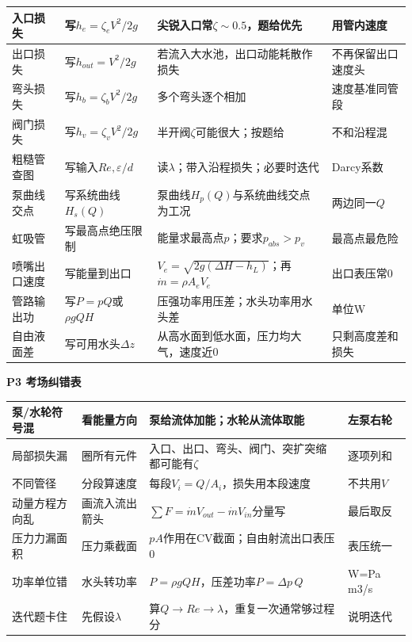 \documentclass[UTF8,a4paper]{ctexart}
\newcommand{\ftitle}[1]{\vspace{1pt}\textbf{\textcolor{B}{#1}}\par\vspace{0.5pt}}
\begin{document}
\begin{tabular}{|L{0.19\textwidth}|L{0.23\textwidth}|L{0.34\textwidth}|L{0.19\textwidth}|}\hline
入口损失 & 写$h_e=\zeta_eV^2/2g$ & 尖锐入口常$\zeta\sim0.5$，题给优先 & 用管内速度 \\\hline
出口损失 & 写$h_{out}=V^2/2g$ & 若流入大水池，出口动能耗散作损失 & 不再保留出口速度头 \\\hline
弯头损失 & 写$h_b=\zeta_bV^2/2g$ & 多个弯头逐个相加 & 速度基准同管段 \\\hline
阀门损失 & 写$h_v=\zeta_vV^2/2g$ & 半开阀$\zeta$可能很大；按题给 & 不和沿程混 \\\hline
粗糙管查图 & 写输入$Re,\varepsilon/d$ & 读$\lambda$；带入沿程损失；必要时迭代 & Darcy系数 \\\hline
泵曲线交点 & 写系统曲线$H_s(Q)$ & 泵曲线$H_p(Q)$与系统曲线交点为工况 & 两边同一$Q$ \\\hline
虹吸管 & 写最高点绝压限制 & 能量求最高点$p$；要求$p_{abs}>p_v$ & 最高点最危险 \\\hline
喷嘴出口速度 & 写能量到出口 & $V_e=\sqrt{2g(\Delta H-h_L)}$；再$\dot m=\rho A_eV_e$ & 出口表压常0 \\\hline
管路输出功 & 写$P=pQ$或$\rho gQH$ & 压强功率用压差；水头功率用水头差 & 单位W \\\hline
自由液面差 & 写可用水头$\Delta z$ & 从高水面到低水面，压力均大气，速度近0 & 只剩高度差和损失 \\\hline
\end{tabular}
\ftitle{P3 考场纠错表}
\begin{tabular}{|L{0.22\textwidth}|L{0.25\textwidth}|L{0.33\textwidth}|L{0.15\textwidth}|}\hline
泵/水轮符号混 & 看能量方向 & 泵给流体加能；水轮从流体取能 & 左泵右轮 \\\hline
局部损失漏 & 圈所有元件 & 入口、出口、弯头、阀门、突扩突缩都可能有$\zeta$ & 逐项列和 \\\hline
不同管径 & 分段算速度 & 每段$V_i=Q/A_i$，损失用本段速度 & 不共用$V$ \\\hline
动量方程方向乱 & 画流入流出箭头 & $\sum F=\dot m V_{out}-\dot m V_{in}$分量写 & 最后取反 \\\hline
压力力漏面积 & 压力乘截面 & $pA$作用在CV截面；自由射流出口表压0 & 表压统一 \\\hline
功率单位错 & 水头转功率 & $P=\rho gQH$，压差功率$P=\Delta p\,Q$ & W=Pa m3/s \\\hline
迭代题卡住 & 先假设$\lambda$ & 算$Q\to Re\to\lambda$，重复一次通常够过程分 & 说明迭代 \\\hline
\end{tabular}
\newpage
\end{document}
